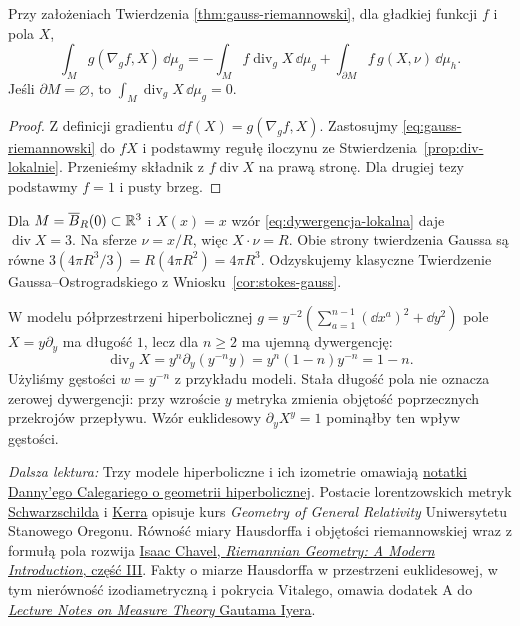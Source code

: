 \begin{wniosek}
\label{cor:riemann-calkowanie-przez-czesci}
Przy założeniach Twierdzenia
\ref{thm:gauss-riemannowski}, dla gładkiej
funkcji $f$ i pola $X$,
\[
 \int_M g(\nabla_gf,X)\,\dd\mu_g
 =-\int_M f\operatorname{div}_gX\,\dd\mu_g
   +\int_{\partial M}f\,g(X,\nu)\,\dd\mu_h.
\]
Jeśli $\partial M=\varnothing$, to
$\int_M\operatorname{div}_gX\,\dd\mu_g=0$.
\end{wniosek}
\begin{proof}
Z definicji gradientu $\dd f(X)=g(\nabla_gf,X)$.
Zastosujmy \eqref{eq:gauss-riemannowski}
do $fX$ i podstawmy regułę iloczynu
ze Stwierdzenia~\ref{prop:div-lokalnie}.
Przenieśmy składnik z $f\operatorname{div}X$
na prawą stronę. Dla drugiej tezy podstawmy
$f=1$ i pusty brzeg.
\end{proof}

\noindent\begin{minipage}{\linewidth}
\begin{przyklad}
Dla $M=\overline B_R(0)\subset\mathbb{R}^3$
i $X(x)=x$ wzór \eqref{eq:dywergencja-lokalna}
daje $\operatorname{div}X=3$.
Na sferze $\nu=x/R$, więc $X\cdot\nu=R$.
Obie strony twierdzenia Gaussa są równe
$3(4\pi R^3/3)=R(4\pi R^2)=4\pi R^3$.
Odzyskujemy klasyczne Twierdzenie
Gaussa--Ostrogradskiego
z Wniosku~\ref{cor:stokes-gauss}.

W modelu półprzestrzeni hiperbolicznej
$g=y^{-2}(\sum_{a=1}^{n-1}(\dd x^a)^2+\dd y^2)$
pole $X=y\partial_y$ ma długość $1$, lecz dla $n\geq2$
ma ujemną dywergencję:
\[
 \operatorname{div}_gX
 =y^n\partial_y(y^{-n}y)
 =y^n(1-n)y^{-n}=1-n.
\]
Użyliśmy gęstości $w=y^{-n}$ z przykładu modeli.
Stała długość pola nie oznacza zerowej dywergencji:
przy wzroście $y$ metryka zmienia objętość poprzecznych
przekrojów przepływu. Wzór euklidesowy $\partial_yX^y=1$
pominąłby ten wpływ gęstości.
\end{przyklad}

\par\smallskip
{\footnotesize\noindent\emph{Dalsza lektura:}
Trzy modele hiperboliczne i ich izometrie omawiają
\href{https://math.uchicago.edu/~dannyc/courses/kleinian_groups_2015/kleinian_groups.pdf}
{notatki Danny'ego Calegariego o geometrii hiperbolicznej}.
Postacie lorentzowskich metryk
\href{https://sites.science.oregonstate.edu/physics/coursewikis/GGR/_export/xhtml/book/ggr/schwarz.html}
{Schwarzschilda} i
\href{https://sites.science.oregonstate.edu/coursewikis/GGR/book/content/kerr}
{Kerra} opisuje kurs \emph{Geometry of General Relativity}
Uniwersytetu Stanowego Oregonu.
Równość miary Hausdorffa i objętości
riemannowskiej wraz z formułą pola rozwija
\href{https://doi.org/10.1017/CBO9780511616822.005}
{Isaac Chavel, \emph{Riemannian Geometry:
A Modern Introduction}, część III}.
Fakty o miarze Hausdorffa w przestrzeni euklidesowej,
w tym nierówność izodiametryczną i pokrycia Vitalego,
omawia dodatek A do
\href{https://www.math.cmu.edu/~gautam/sj/teaching/2022-23/720-measure/pdfs/measure.pdf}
{\emph{Lecture Notes on Measure Theory} Gautama Iyera}.\par}
\end{minipage}\par
